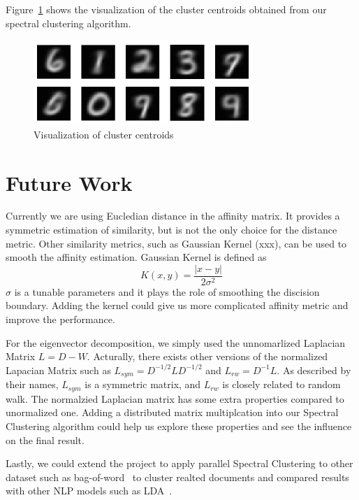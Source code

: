 \documentclass{acm_proc_article-sp}
\begin{document}
Figure~\ref{visual_centroids} shows the visualization of the cluster centroids obtained from our spectral clustering algorithm.
\begin{figure}[ht]
\centering
\includegraphics[height=3.2cm]{scdigits.png}
\caption{Visualization of cluster centroids}
\label{visual_centroids}
\end{figure}

\section{Future Work}
Currently we are using Eucledian distance in the affinity matrix. It provides a symmetric estimation of similarity, but is not the only choice for the distance metric. Other similarity metrics, such as Gaussian Kernel (xxx), can be used to smooth the affinity estimation. Gaussian Kernel is defined as $$K(x, y) = \frac{|x - y|}{2\sigma^2}$$ $\sigma$ is a tunable parameters and it plays the role of smoothing the discision boundary. Adding the kernel could give us more complicated affinity metric and improve the performance.

For the eigenvector decomposition, we simply used the unnomarlized Laplacian Matrix $L = D - W$. Acturally, there exists other versions of the normalized Lapacian Matrix such as $L_{sym} = D^{-1/2}LD^{-1/2}$ and $L_{rw} = D^{-1}L$. As described by their names, $L_{sym}$ is a symmetric matrix, and $L_{rw}$ is closely related to random walk. The normalzied Laplacian matrix has some extra properties compared to unormalized one. Adding a distributed matrix multiplcation into our Spectral Clustering algorithm could help us explore these properties and see the influence on the final result.

Lastly, we could extend the project to apply parallel Spectral Clustering to other dataset such as bag-of-word~\cite{Lichman:2013} to cluster realted documents and compared results with other NLP models such as LDA~\cite{blei2003latent}.
\end{document}
